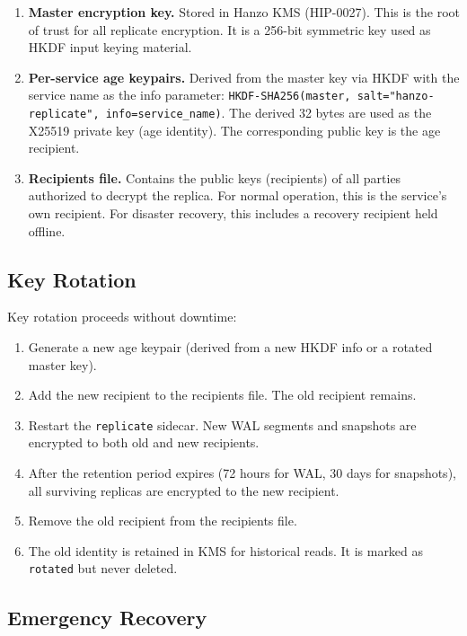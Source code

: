 \documentclass[11pt]{article}
\begin{document}
\begin{enumerate}[nosep]
    \item \textbf{Master encryption key.} Stored in Hanzo KMS (HIP-0027).
    This is the root of trust for all replicate encryption. It is a 256-bit
    symmetric key used as HKDF input keying material.

    \item \textbf{Per-service age keypairs.} Derived from the master key via
    HKDF with the service name as the info parameter:
    \texttt{HKDF-SHA256(master, salt="hanzo-replicate", info=service\_name)}.
    The derived 32 bytes are used as the X25519 private key (age identity).
    The corresponding public key is the age recipient.

    \item \textbf{Recipients file.} Contains the public keys (recipients) of
    all parties authorized to decrypt the replica. For normal operation, this
    is the service's own recipient. For disaster recovery, this includes a
    recovery recipient held offline.
\end{enumerate}

\subsection{Key Rotation}

Key rotation proceeds without downtime:

\begin{enumerate}[nosep]
    \item Generate a new age keypair (derived from a new HKDF info or a
    rotated master key).
    \item Add the new recipient to the recipients file. The old recipient
    remains.
    \item Restart the \texttt{replicate} sidecar. New WAL segments and
    snapshots are encrypted to both old and new recipients.
    \item After the retention period expires (72 hours for WAL, 30 days for
    snapshots), all surviving replicas are encrypted to the new recipient.
    \item Remove the old recipient from the recipients file.
    \item The old identity is retained in KMS for historical reads. It is
    marked as \texttt{rotated} but never deleted.
\end{enumerate}

\subsection{Emergency Recovery}
\end{document}
